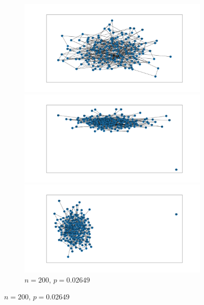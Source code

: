 \documentclass{article}
\begin{document}
\begin{figure}[htb]
    \par\bigskip

    \begin{subfigure}{\textwidth}
        \centering
        \begin{minipage}{0.32\textwidth}
            \centering
            \includegraphics[width=\linewidth]{images/erdos_renyi/n200_p0.02649158683274018_0.png}
        \end{minipage}\hfill
        \begin{minipage}{0.32\textwidth}
            \centering
            \includegraphics[width=\linewidth]{images/erdos_renyi/n200_p0.02649158683274018_1.png}
        \end{minipage}\hfill
        \begin{minipage}{0.32\textwidth}
            \centering
            \includegraphics[width=\linewidth]{images/erdos_renyi/n200_p0.02649158683274018_2.png}
        \end{minipage}
        \caption{$n=200$, $p=0.02649$}
    \end{subfigure}


\end{figure}
\end{document}
